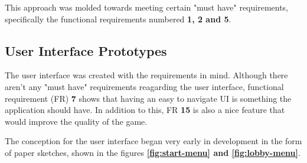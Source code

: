 \documentclass{dissertation}
\begin{document}
This approach was molded towards meeting certain "must have" requirements, specifically the functional requirements numbered \textbf{1, 2 and 5}.

\subsection{User Interface Prototypes}

The user interface was created with the requirements in mind. Although there aren't any "must have" requirements reagarding the user interface, functional requirement (FR) \textbf{7} shows that having an easy to navigate UI is something the application should have. In addition to this, FR \textbf{15} is also a nice feature that would improve the quality of the game.

The conception for the user interface began very early in development in the form of paper sketches, shown in the figures \textbf{\ref{fig:start-menu} and \ref{fig:lobby-menu}}.
\end{document}
